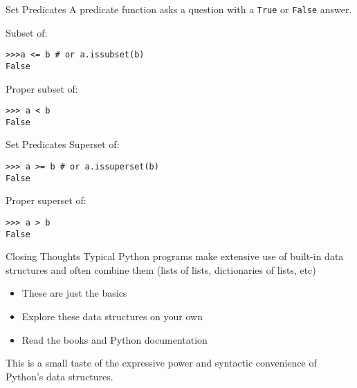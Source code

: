 \documentclass[smaller, aspectratio=1610]{beamer}
\begin{document}
\begin{frame}[label={sec:org0dcb91a},fragile]{Set Predicates}
 A predicate function asks a question with a \texttt{True} or \texttt{False} answer.

Subset of:

\lstset{language=Python,label= ,caption= ,captionpos=b,numbers=none}
\begin{lstlisting}
>>>a <= b # or a.issubset(b)
False
\end{lstlisting}

Proper subset of:

\lstset{language=Python,label= ,caption= ,captionpos=b,numbers=none}
\begin{lstlisting}
>>> a < b
False
\end{lstlisting}
\end{frame}

\begin{frame}[label={sec:org979d049},fragile]{Set Predicates}
 Superset of:

\lstset{language=Python,label= ,caption= ,captionpos=b,numbers=none}
\begin{lstlisting}
>>> a >= b # or a.issuperset(b)
False
\end{lstlisting}

Proper superset of:

\lstset{language=Python,label= ,caption= ,captionpos=b,numbers=none}
\begin{lstlisting}
>>> a > b
False
\end{lstlisting}
\end{frame}

\begin{frame}[label={sec:orgdcb136f}]{Closing Thoughts}
Typical Python programs make extensive use of built-in data structures and often combine them (lists of lists, dictionaries of lists, etc)

\begin{itemize}
\item These are just the basics
\item Explore these data structures on your own
\item Read the books and Python documentation
\end{itemize}


This is a small taste of the expressive power and syntactic
convenience of Python's data structures.
\end{frame}
\end{document}
